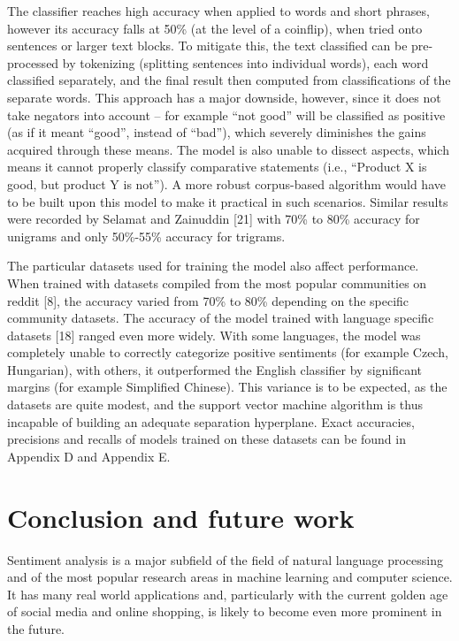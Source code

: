 \documentclass[12pt,journal,compsoc]{IEEEtran}
\begin{document}
The classifier reaches high accuracy when applied to words and short phrases, however its accuracy falls at 50\% (at the level of a coinflip), when tried onto sentences or larger text blocks. To mitigate this, the text classified can be pre-processed by tokenizing (splitting sentences into individual words), each word classified separately, and the final result then computed from classifications of the separate words. This approach has a major downside, however, since it does not take negators into account – for example “not good” will be classified as positive (as if it meant “good”, instead of “bad”), which severely diminishes the gains acquired through these means. The model is also unable to dissect aspects, which means it cannot properly classify comparative statements (i.e., “Product X is good, but product Y is not”). A more robust corpus-based algorithm would have to be built upon this model to make it practical in such scenarios. Similar results were recorded by Selamat and Zainuddin [21] with 70\% to 80\% accuracy for unigrams and only 50\%-55\% accuracy for trigrams.

The particular datasets used for training the model also affect performance. When trained with datasets compiled from the most popular communities on reddit [8], the accuracy varied from 70\% to 80\% depending on the specific community datasets. The accuracy of the model trained with language specific datasets [18] ranged even more widely. With some languages, the model was completely unable to correctly categorize positive sentiments (for example Czech, Hungarian), with others, it outperformed the English classifier by significant margins (for example Simplified Chinese). This variance is to be expected, as the datasets are quite modest, and the support vector machine algorithm is thus incapable of building an adequate separation hyperplane. Exact accuracies, precisions and recalls of models trained on these datasets can be found in Appendix D and Appendix E.

\section{Conclusion and future work}
Sentiment analysis is a major subfield of the field of natural language processing and of the most popular research areas in machine learning and computer science. It has many real world applications and, particularly with the current golden age of social media and online shopping, is likely to become even more prominent in the future.
\end{document}
